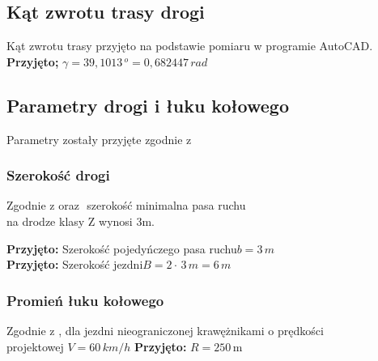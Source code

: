\documentclass[12pt]{article}
\begin{document}
    \subsection{Kąt zwrotu trasy drogi}
    	Kąt zwrotu trasy przyjęto na podstawie pomiaru w programie AutoCAD.\\
        \newline
    	\textbf{Przyjęto;} \( \gamma = 39,1013 \,^{o} = 0,682447 \,rad \) 
    	
    
    \subsection{Parametry drogi i łuku kołowego}
    	
    	Parametry zostały przyjęte zgodnie z\\
    	\selectfont{"Rozporządzenie Ministra Transportu i Gospodarki Morskiej z dnia 2 Marca 1999r.\\
    	w sprawie warunków technicznych jakim powinny odpowiadać drogi publiczne\\ i ich usytuowanie"\quad Dz. U. Nr 43 poz.430\quad(dalej RMTiGW)}
   
    	\subsubsection{Szerokość drogi}
    		Zgodnie z \selectfont{RMTiGW}
            oraz \selectfont{Rozporządzeniem Ministra Infrastruktury i Rozwoju\\
            z dnia 10 marca 2015r. §15.1\,\,(dalej RMIiR)}\,\,szerokość minimalna pasa ruchu\\
            na drodze klasy Z wynosi 3m. \newline
            
            \textbf{Przyjęto:} Szerokość pojedyńczego pasa ruchu\quad \( b=3\,m \) \\
    	    \textbf{Przyjęto:} Szerokość jezdni\quad \( B = 2 \cdot\,3\,m = 6\,m\)
    	
    	
    	\subsubsection{Promień łuku kołowego}
            Zgodnie z \selectfont{RMTiGW §21.1c},
            dla jezdni nieograniczonej krawężnikami o prędkości\\
            projektowej $V=60\,km/h$ \quad \textbf{Przyjęto:} $R = 250$\,m
    		
\end{document}
